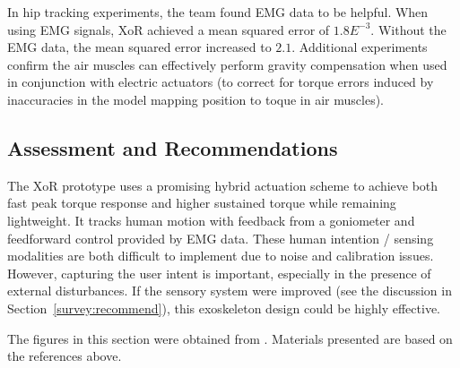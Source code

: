 \begin{refsection}
In hip tracking experiments, the team found EMG data to be helpful.  When using EMG signals, XoR achieved a mean squared error of $1.8E^{-3}$.  Without the EMG data, the mean squared error increased to $2.1$.  Additional experiments confirm the air muscles can effectively perform gravity compensation when used in conjunction with electric actuators (to correct for torque errors induced by inaccuracies in the model mapping position to toque in air muscles).


\subsection{Assessment and Recommendations}

The XoR prototype uses a promising hybrid actuation scheme to achieve both fast peak torque response and higher sustained torque while remaining lightweight.  It tracks human motion with feedback from a goniometer and feedforward control provided by EMG data.  These human intention / sensing modalities are both difficult to implement due to noise and calibration issues.  However, capturing the user intent is important, especially in the presence of external disturbances.  If the sensory system were improved (see the discussion in Section~\ref{survey:recommend}), this exoskeleton design could be highly effective. 

\nocite{*}
\printbibliography[heading=subbibliography]

The figures in this section were obtained from \cite{xorDesign2011,XoRkinemExtraction2012}. Materials presented are based on the references above.

\end{refsection}
